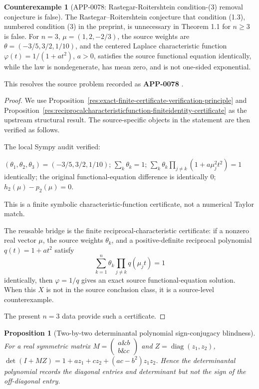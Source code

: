 \documentclass[11pt]{article}
\numberwithin{equation}{section}
\newtheorem{proposition}[theorem]{Proposition}
\theoremstyle{definition}
\newtheorem{counterexample}[theorem]{Counterexample}
\theoremstyle{remark}
\newcommand{\1}{\mathbf 1}
\begin{document}
\begin{counterexample}[APP-0078: Rastegar-Roitershtein condition-(3) removal conjecture is false]
\label{res:not-rastegarroitershtein-condition3-unnecessary}
The Rastegar--Roitershtein conjecture that condition (1.3), numbered condition (3) in the preprint, is unnecessary in Theorem 1.1 for \(n\ge3\) is false. For \(n=3\), \(\mu=(1,2,-2/3)\), the source weights are \(\theta=(-3/5,3/2,1/10)\), and the centered Laplace characteristic function \(\varphi(t)=1/(1+a t^2)\), \(a>0\), satisfies the source functional equation identically, while the law is nondegenerate, has mean zero, and is not one-sided exponential.



This resolves the source problem recorded as \textbf{APP-0078} \cite{app-app-0078-source}.
\end{counterexample}

\begin{proof}
We use Proposition~\ref{res:exact-finite-certificate-verification-principle} and Proposition~\ref{res:reciprocalcharacteristicfunction-finiteidentity-certificate} as the upstream structural result. The source-specific objects in the statement are then verified as follows.

The local Sympy audit verified:

\((\theta_1,\theta_2,\theta_3)=(-3/5,3/2,1/10)\);
\(\sum_k\theta_k=1\);
\(\sum_k\theta_k\prod_{j\ne k}(1+a\mu_j^2t^2)=1\) identically;
the original functional-equation difference is identically \(0\);
\(h_2(\mu)-p_2(\mu)=0\).

This is a finite symbolic characteristic-function certificate, not a numerical Taylor match.

The reusable bridge is the finite reciprocal-characteristic certificate:
if a nonzero real vector \(\mu\), the source weights \(\theta_k\), and a positive-definite reciprocal polynomial \(q(t)=1+a t^2\) satisfy
\[
\sum_{k=1}^n\theta_k\prod_{j\ne k}q(\mu_jt)=1
\]
identically, then \(\varphi=1/q\) gives an exact source functional-equation solution. When this \(X\) is not in the source conclusion class, it is a source-level counterexample.

The present \(n=3\) data provide such a certificate.
\end{proof}

\begin{proposition}[Two-by-two determinantal polynomial sign-conjugacy blindness]
\label{res:determinantalpolynomial-signconjugacy-blindness}
For a real symmetric matrix \(M=\begin{pmatrix}a\&b\\ b\&c\end{pmatrix}\) and \(Z=\operatorname{diag}(z_1,z_2)\), \(\det(I+MZ)=1+a z_1+c z_2+(ac-b^2)z_1z_2\). Hence the determinantal polynomial records the diagonal entries and determinant but not the sign of the off-diagonal entry.
\end{proposition}
\end{document}
